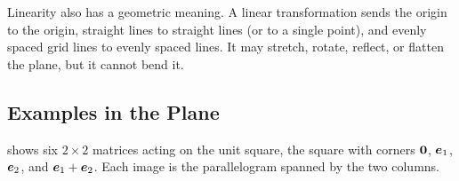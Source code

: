 Linearity also has a geometric meaning. A linear transformation sends the
origin to the origin, straight lines to straight lines (or to a single
point), and evenly spaced grid lines to evenly spaced lines. It may
stretch, rotate, reflect, or flatten the plane, but it cannot bend it.

\subsection{Examples in the Plane}
\label{sec:ch03-plane-examples}

 shows six $2 \times 2$ matrices acting on the
unit square, the square with corners $\bm{0}$, $\bm{e}_1$,
$\bm{e}_2$, and $\bm{e}_1 + \bm{e}_2$. Each image is the
parallelogram spanned by the two columns.

